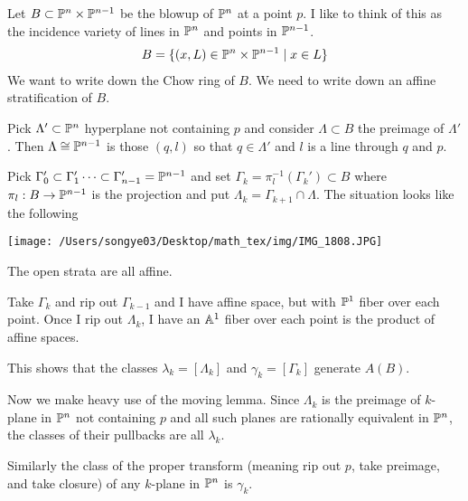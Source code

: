 \documentclass[12pt]{article}
\begin{document}
\begin{example}
    Let $B\subset \P^n\times \P^{n-1}$ be the blowup of $\P^n$ at a point $p$. I like to think of
    this as the incidence variety of lines in $\P^n$ and points in $\P^{n-1}$. \begin{align*}
        B = \{(x,L) \in \P^n\times \P^{n-1}\mid x\in L\}
    \end{align*}
    We want to write down the Chow ring of $B$. We need to write down an affine stratification of $B$.

    \hfill

    Pick $\Lambda' \subset \P^n$ hyperplane not containing $p$ and consider $\Lambda \subset B$ the preimage of $\Lambda'$.
    Then $\Lambda \cong \P^{n-1}$ is those $(q,l)$ so that $q\in \Lambda'$ and $l$ is a line through $q$ and $p$.

    \hfill

    Pick $\Gamma_0' \subset \Gamma_1'\dots \subset \Gamma_{n-1}' = \P^{n-1}$ and set
    $\Gamma_k = \pi_l^{-1}(\Gamma_k')\subset B$ where $\pi_l:B\to \P^{n-1}$ is the projection and put 
    $\Lambda_k = \Gamma_{k+1} \cap \Lambda$. The situation looks like the following \begin{center}
        \texttt{[image: /Users/songye03/Desktop/math\_tex/img/IMG\_1808.JPG]}
    \end{center}
    The open strata are all affine. 

    \hfill

    Take $\Gamma_k$ and rip out $\Gamma_{k-1}$ and I have affine space, but with $\P^1$ fiber over each point.
    Once I rip out $\Lambda_k$, I have an $\A^1$ fiber over each point is the product of affine spaces. 

    \hfill

    This shows that the classes $\lambda_k = [\Lambda_k]$ and $\gamma_k = [\Gamma_k]$ generate $A(B)$.

    \hfill

    Now we make heavy use of the moving lemma. Since $\Lambda_k$ is the preimage of $k$-plane in $\P^n$
    not containing $p$ and all such planes are rationally equivalent in $\P^n$, 
    the classes of their pullbacks are all $\lambda_k$.

    \hfill

    Similarly the class of the proper transform (meaning rip out $p$, take preimage, and take closure) 
    of any $k$-plane in $\P^n$ is $\gamma_k$. 


\end{example}
\end{document}
